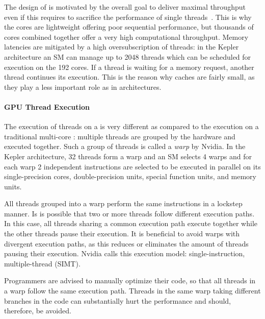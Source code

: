 The design of \GPUs is motivated by the overall goal to deliver maximal throughput even if this requires to sacrifice the performance of single threads~\cite{GarlandK10}.
This is why the \GPU cores are lightweight offering poor sequential performance, but thousands of cores combined together offer a very high computational throughput.
Memory latencies are mitigated by a high oversubscription of threads:
in the Kepler architecture an SM can manage up to 2048 threads which can be scheduled for execution on the 192 cores.
If a thread is waiting for a memory request, another thread continues its execution.
This is the reason why caches are fairly small, as they play a less important role as in \CPU architectures.

\paragraph{GPU Thread Execution}
The execution of threads on a \GPU is very different as compared to the execution on a traditional multi-core \CPU:
multiple threads are grouped by the hardware and executed together.
Such a group of threads is called a \emph{warp} by Nvidia.
In the Kepler architecture, 32 threads form a warp and an SM selects 4 warps and for each warp 2 independent instructions are selected to be executed in parallel on its single-precision cores, double-precision units, special function units, and memory units.

All threads grouped into a warp perform the same instructions in a lockstep manner.
Is is possible that two or more threads follow different execution paths.
In this case, all threads sharing a common execution path execute together while the other threads pause their execution.
It is beneficial to avoid warps with divergent execution paths, as this reduces or eliminates the amount of threads pausing their execution.
Nvidia calls this execution model: single-instruction, multiple-thread (SIMT).

Programmers are advised to manually optimize their code, so that all threads in a warp follow the same execution path.
Threads in the same warp taking different branches in the code can substantially hurt the performance and should, therefore, be avoided.


